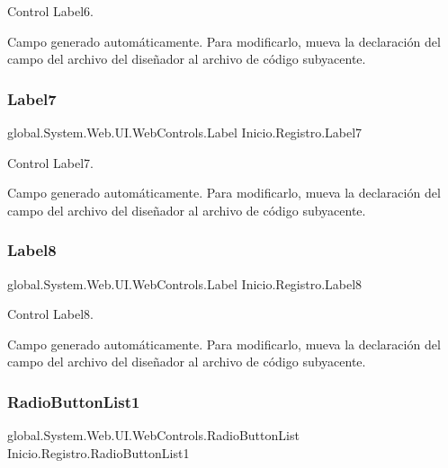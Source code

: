 Control Label6. 

Campo generado automáticamente. Para modificarlo, mueva la declaración del campo del archivo del diseñador al archivo de código subyacente. \mbox{\label{class_inicio_1_1_registro_a1f3fd3c1774cb311690a4246ba5aca66}} 
\subsubsection{\texorpdfstring{Label7}{Label7}}
{\footnotesize\ttfamily global.\+System.\+Web.\+U\+I.\+Web\+Controls.\+Label Inicio.\+Registro.\+Label7\hspace{0.3cm}{\ttfamily [protected]}}



Control Label7. 

Campo generado automáticamente. Para modificarlo, mueva la declaración del campo del archivo del diseñador al archivo de código subyacente. \mbox{\label{class_inicio_1_1_registro_a8f64d7bc53c3f17751f32a57cef78ddb}} 
\subsubsection{\texorpdfstring{Label8}{Label8}}
{\footnotesize\ttfamily global.\+System.\+Web.\+U\+I.\+Web\+Controls.\+Label Inicio.\+Registro.\+Label8\hspace{0.3cm}{\ttfamily [protected]}}



Control Label8. 

Campo generado automáticamente. Para modificarlo, mueva la declaración del campo del archivo del diseñador al archivo de código subyacente. \mbox{\label{class_inicio_1_1_registro_a6a93f0b66e0c307a8f53722f3f41ce91}} 
\subsubsection{\texorpdfstring{RadioButtonList1}{RadioButtonList1}}
{\footnotesize\ttfamily global.\+System.\+Web.\+U\+I.\+Web\+Controls.\+Radio\+Button\+List Inicio.\+Registro.\+Radio\+Button\+List1\hspace{0.3cm}{\ttfamily [protected]}}



